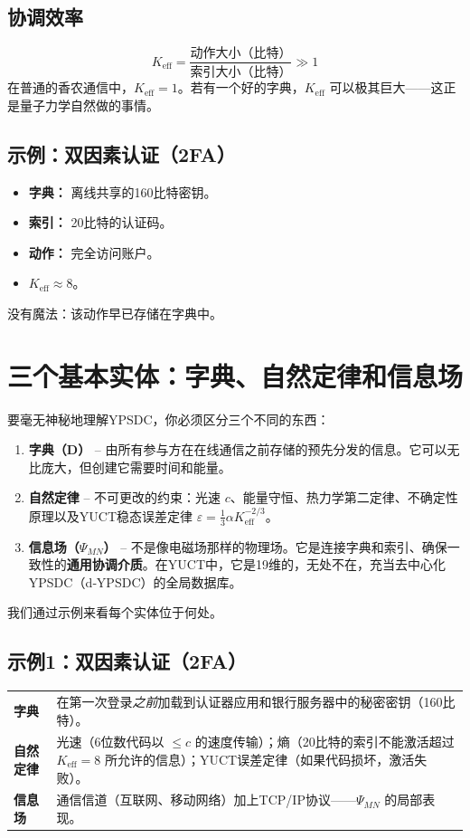 \documentclass[12pt,a4paper]{article}
\begin{document}
	\subsection{协调效率}
	\[
	K_{\mathrm{eff}} = \frac{\text{动作大小（比特）}}{\text{索引大小（比特）}} \gg 1
	\]
	在普通的香农通信中，\(K_{\mathrm{eff}}=1\)。若有一个好的字典，\(K_{\mathrm{eff}}\) 可以极其巨大——这正是量子力学自然做的事情。
	
	\subsection{示例：双因素认证（2FA）}
	\begin{itemize}
		\item \textbf{字典：} 离线共享的160比特密钥。
		\item \textbf{索引：} 20比特的认证码。
		\item \textbf{动作：} 完全访问账户。
		\item \(K_{\mathrm{eff}} \approx 8\)。
	\end{itemize}
	没有魔法：该动作早已存储在字典中。
	
	\section{三个基本实体：字典、自然定律和信息场}
	
	要毫无神秘地理解YPSDC，你必须区分三个不同的东西：
	
	\begin{enumerate}
		\item \textbf{字典（D）} – 由所有参与方在在线通信之前存储的预先分发的信息。它可以无比庞大，但创建它需要时间和能量。
		\item \textbf{自然定律} – 不可更改的约束：光速 \(c\)、能量守恒、热力学第二定律、不确定性原理以及YUCT稳态误差定律 \(\varepsilon = \frac13 \alpha K_{\mathrm{eff}}^{-2/3}\)。
		\item \textbf{信息场（\(\Psi_{MN}\)）} – 不是像电磁场那样的物理场。它是连接字典和索引、确保一致性的\textbf{通用协调介质}。在YUCT中，它是19维的，无处不在，充当去中心化YPSDC（d‑YPSDC）的全局数据库。
	\end{enumerate}
	
	我们通过示例来看每个实体位于何处。
	
	\subsection{示例1：双因素认证（2FA）}
	
	\begin{tabular}{p{2.8cm} p{10cm}}
		\textbf{字典} & 在第一次登录\emph{之前}加载到认证器应用和银行服务器中的秘密密钥（160比特）。 \\
		\textbf{自然定律} & 光速（6位数代码以 \(\le c\) 的速度传输）；熵（20比特的索引不能激活超过 \(K_{\mathrm{eff}}=8\) 所允许的信息）；YUCT误差定律（如果代码损坏，激活失败）。 \\
		\textbf{信息场} & 通信信道（互联网、移动网络）加上TCP/IP协议——\(\Psi_{MN}\) 的局部表现。 \\
	\end{tabular}
	
\end{document}
